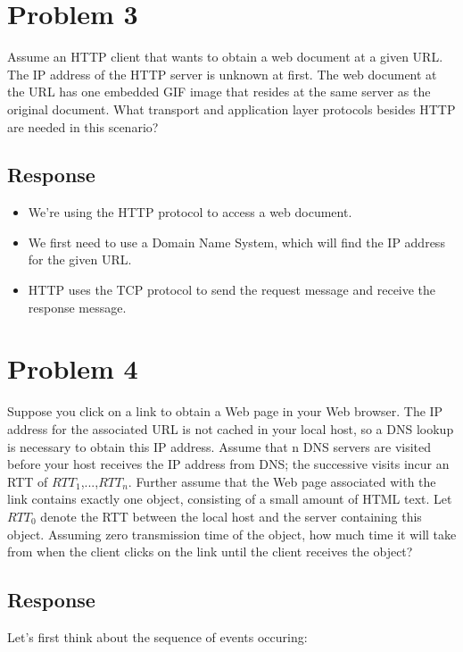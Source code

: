 \documentclass{article}
\begin{document}
\section{Problem 3}

Assume an HTTP client that wants to obtain a web document at a given URL. The IP address of the HTTP server is unknown at first. The web document at the URL has one embedded GIF image that resides at the same server as the original document. What transport and application layer protocols besides HTTP are needed in this scenario?

\subsection{Response}

\begin{itemize}
    \item We're using the HTTP protocol to access a web document.
    \item We first need to use a Domain Name System, which will find the IP address for the given URL.
    \item HTTP uses the TCP protocol to send the request message and receive the response message.
\end{itemize}

\section{Problem 4}

Suppose you click on a link to obtain a Web page in your Web browser. The IP address for the associated URL is not cached in your local host, so a DNS lookup is necessary to obtain this IP address. Assume that n DNS servers are visited before your host receives the IP address from DNS; the successive visits incur an RTT of $RTT_1$,...,$RTT_n$. Further assume that the Web page associated with the link contains exactly one object, consisting of a small amount of HTML text. Let $RTT_0$ denote the RTT between the local host and the server containing this object. Assuming zero transmission time of the object, how much time it will take from when the client clicks on the link until the client receives the object?

\subsection{Response}

Let's first think about the sequence of events occuring:
\end{document}
